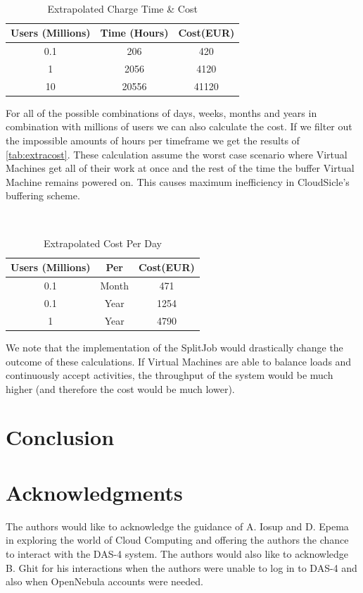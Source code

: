 \documentclass[twocolumn,twoside]{IEEEtran}
\begin{document}
\begin{table}[htb]
\caption{Extrapolated Charge Time \& Cost}
\label{tab:extracharge}
\begin{center}
{\tt
\begin{tabular}{|c||c|c|}
\hline
Users (Millions)&Time (Hours)&Cost(EUR)\\\hline\hline
0.1&206&420\\\hline
1&2056&4120\\\hline
10&20556&41120\\\hline
\end{tabular}
} 
\end{center}
\end{table}

For all of the possible combinations of days, weeks, months and years in combination
with millions of users we can also calculate the cost. If we filter out the impossible
amounts of hours per timeframe we get the results of \autoref{tab:extracost}.
These calculation assume the worst case scenario where Virtual Machines get
all of their work at once and the rest of the time the buffer Virtual Machine
remains powered on. This causes maximum inefficiency in CloudSicle's buffering
scheme.

\begin{table}[htb]
\caption{Extrapolated Cost Per Day}
\label{tab:extracost}
\begin{center}
{\tt
\begin{tabular}{|c|c||c|}
\hline
Users (Millions)&Per&Cost(EUR)\\\hline\hline
0.1&Month&471\\\hline
0.1&Year&1254\\\hline
1&Year&4790\\\hline
\end{tabular}
} 
\end{center}
\end{table}

We note that the implementation of the SplitJob would drastically change the
outcome of these calculations. If Virtual Machines are able to balance loads and
continuously accept activities, the throughput of the system would be much
higher (and therefore the cost would be much lower).

\section{Conclusion}
\label{sec:concl}

\section*{Acknowledgments}
\noindent The authors would like to acknowledge the guidance of A. Iosup and
D. Epema in exploring the world of Cloud Computing and offering
the authors the chance to interact with the DAS-4 system.
The authors would also like to acknowledge B. Ghit for his interactions
when the authors were unable to log in to DAS-4 and also when OpenNebula
accounts were needed.
\end{document}
